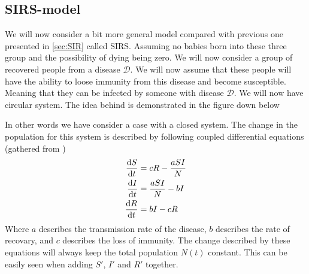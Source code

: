 \documentclass[a4paper, 10pt]{article}
\begin{document}
\subsection{SIRS-model}\label{SIRS model}
We will now consider a bit more general model compared with previous one presented in \eqref{sec:SIR} called SIRS.
Assuming no babies born into these three group and the possibility of dying being zero.
We will now consider a group of recovered people from a disease $\mathcal{D}$. We will now assume that these
people will have the ability to loose immunity from this disease and become susceptible. Meaning that they can
be infected by someone with disease $\mathcal{D}$.
We will now have circular system. The idea behind is demonstrated in the figure down below
\begin{center}
\end{center}
In other words we have consider a case with a closed system. The change in the population for this system is described by following
coupled differential equations (gathered from \cite{DM})
\begin{align}
  \dv{S}{t} &= cR - \frac{aSI}{N} \\
  \dv{I}{t} &= \frac{aSI}{N} - bI \\
  \dv{R}{t} &= bI - cR
  \label{sirs}
\end{align}
Where $a$ describes the transmission rate of the disease, $b$ describes the rate of recovary, and $c$
describes the loss of immunity. The change described by these equations will always keep the
total population $N(t)$ constant. This can be easily seen when adding $S'$, $I'$ and $R'$ together.
\end{document}

